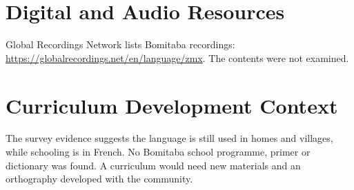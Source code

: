 \documentclass[12pt]{article}
\begin{document}
\section{Digital and Audio Resources}
Global Recordings Network lists Bomitaba recordings: \url{https://globalrecordings.net/en/language/zmx}. The contents were not examined.

\section{Curriculum Development Context}
The survey evidence suggests the language is still used in homes and villages, while schooling is in French. No Bomitaba school programme, primer or dictionary was found. A curriculum would need new materials and an orthography developed with the community.
\end{document}
